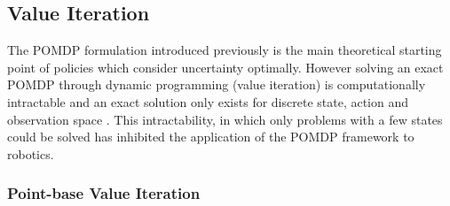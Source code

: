 


\subsection{Value Iteration}\label{lit:VI}

The POMDP formulation introduced previously is the main theoretical starting point of policies which
consider uncertainty optimally. However solving an exact POMDP through dynamic programming (value iteration) is 
computationally intractable and an exact solution only exists for discrete state, action and observation space \cite[Chap. 15]{Thrun_2005}. 
This intractability, in which only problems with a few states could be solved has inhibited the application of the POMDP framework to robotics. 

\subsubsection{Point-base Value Iteration}

